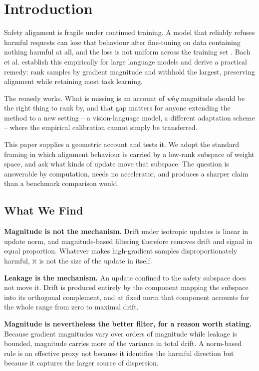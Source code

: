 \documentclass[10pt,twocolumn,letterpaper]{article}
\begin{document}
\section{Introduction}


Safety alignment is fragile under continued training. A model that reliably refuses harmful requests can lose that behaviour after fine-tuning on data containing nothing harmful at all, and the loss is not uniform across the training set \cite{arxiv_2604_17215}. Bach et al. establish this empirically for large language models and derive a practical remedy: rank samples by gradient magnitude and withhold the largest, preserving alignment while retaining most task learning.

The remedy works. What is missing is an account of \textit{why} magnitude should be the right thing to rank by, and that gap matters for anyone extending the method to a new setting -- a vision-language model, a different adaptation scheme -- where the empirical calibration cannot simply be transferred.

This paper supplies a geometric account and tests it. We adopt the standard framing in which alignment behaviour is carried by a low-rank subspace of weight space, and ask what kinds of update move that subspace. The question is answerable by computation, needs no accelerator, and produces a sharper claim than a benchmark comparison would.


\subsection{What We Find}


\textbf{Magnitude is not the mechanism.} Drift under isotropic updates is linear in update norm, and magnitude-based filtering therefore removes drift and signal in equal proportion. Whatever makes high-gradient samples disproportionately harmful, it is not the size of the update in itself.

\textbf{Leakage is the mechanism.} An update confined to the safety subspace does not move it. Drift is produced entirely by the component mapping the subspace into its orthogonal complement, and at fixed norm that component accounts for the whole range from zero to maximal drift.

\textbf{Magnitude is nevertheless the better filter, for a reason worth stating.} Because gradient magnitudes vary over orders of magnitude while leakage is bounded, magnitude carries more of the variance in total drift. A norm-based rule is an effective proxy not because it identifies the harmful direction but because it captures the larger source of dispersion.
\end{document}
